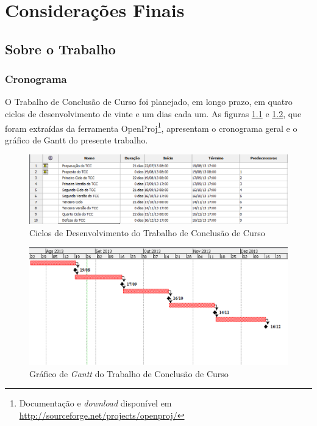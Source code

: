 \chapter{Considerações Finais}


\section{Sobre o Trabalho}


\subsection{Cronograma}
O Trabalho de Conclusão de Curso foi planejado, em longo prazo, em quatro ciclos 
de desenvolvimento de vinte e um dias cada um. 
As figuras \ref{cronograma} e \ref{gantt}, que foram extraídas da ferramenta 
OpenProj\footnote{Documentação e \textit{download} disponível em 
\url{http://sourceforge.net/projects/openproj/}}, 
apresentam o cronograma geral e o gráfico de Gantt do presente trabalho.

\begin{figure}[h]
\centering
	\includegraphics[keepaspectratio=true,scale=0.7]{figuras/marcos.eps}
	\caption{Ciclos de Desenvolvimento do Trabalho de Conclusão de Curso}
	\label{cronograma}
\end{figure}


\begin{figure}[h]
\centering
	\includegraphics[keepaspectratio=true,scale=0.7]{figuras/gantt_chart.eps}
	\caption{Gráfico de \textit{Gantt} do Trabalho de Conclusão de Curso}
	\label{gantt}
\end{figure}

